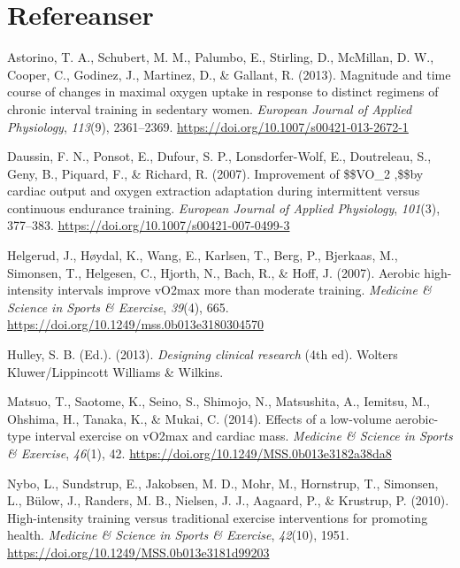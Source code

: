 \documentclass[
  letterpaper,
  DIV=11,
  numbers=noendperiod]{scrartcl}
\newlength{\cslhangindent}
\newlength{\cslentryspacingunit} %
\newenvironment{CSLReferences}[2] %
 {%
  \setlength{\parindent}{0pt}
  \ifodd #1
  \let\oldpar\par
  \def\par{\hangindent=\cslhangindent\oldpar}
  \fi
  \setlength{\parskip}{#2\cslentryspacingunit}
 }%
 {}
\begin{document}
\hypertarget{refereanser}{%
\section*{Refereanser}\label{refereanser}}

\hypertarget{refs}{}
\begin{CSLReferences}{1}{0}
\leavevmode{}%
Astorino, T. A., Schubert, M. M., Palumbo, E., Stirling, D., McMillan,
D. W., Cooper, C., Godinez, J., Martinez, D., \& Gallant, R. (2013).
Magnitude and time course of changes in maximal oxygen uptake in
response to distinct regimens of chronic interval training in sedentary
women. \emph{European Journal of Applied Physiology}, \emph{113}(9),
2361--2369. \url{https://doi.org/10.1007/s00421-013-2672-1}

\leavevmode{}%
Daussin, F. N., Ponsot, E., Dufour, S. P., Lonsdorfer-Wolf, E.,
Doutreleau, S., Geny, B., Piquard, F., \& Richard, R. (2007).
Improvement of
{\$}{\$}\dot{\textbraceleft}V{\textbraceright}\hbox{\textbraceleft}O{\textbraceright}{\_}{\textbraceleft}2
\max{\textbraceright},{\$}{\$}by cardiac output and oxygen extraction
adaptation during intermittent versus continuous endurance training.
\emph{European Journal of Applied Physiology}, \emph{101}(3), 377--383.
\url{https://doi.org/10.1007/s00421-007-0499-3}

\leavevmode{}%
Helgerud, J., Høydal, K., Wang, E., Karlsen, T., Berg, P., Bjerkaas, M.,
Simonsen, T., Helgesen, C., Hjorth, N., Bach, R., \& Hoff, J. (2007).
Aerobic high-intensity intervals improve v{\textperiodcentered}O2max
more than moderate training. \emph{Medicine \& Science in Sports \&
Exercise}, \emph{39}(4), 665.
\url{https://doi.org/10.1249/mss.0b013e3180304570}

\leavevmode{}%
Hulley, S. B. (Ed.). (2013). \emph{Designing clinical research} (4th
ed). Wolters Kluwer/Lippincott Williams \& Wilkins.

\leavevmode{}%
Matsuo, T., Saotome, K., Seino, S., Shimojo, N., Matsushita, A.,
Iemitsu, M., Ohshima, H., Tanaka, K., \& Mukai, C. (2014). Effects of a
low-volume aerobic-type interval exercise on v{\textperiodcentered}O2max
and cardiac mass. \emph{Medicine \& Science in Sports \& Exercise},
\emph{46}(1), 42. \url{https://doi.org/10.1249/MSS.0b013e3182a38da8}

\leavevmode{}%
Nybo, L., Sundstrup, E., Jakobsen, M. D., Mohr, M., Hornstrup, T.,
Simonsen, L., Bülow, J., Randers, M. B., Nielsen, J. J., Aagaard, P., \&
Krustrup, P. (2010). High-intensity training versus traditional exercise
interventions for promoting health. \emph{Medicine \& Science in Sports
\& Exercise}, \emph{42}(10), 1951.
\url{https://doi.org/10.1249/MSS.0b013e3181d99203}

\end{CSLReferences}
\end{document}

